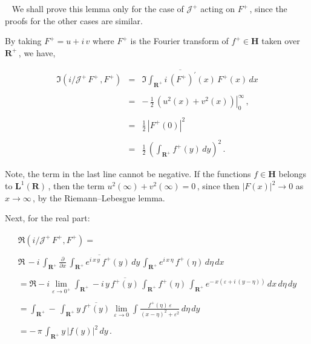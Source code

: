 \documentclass[11pt]{article}
\newenvironment{Proof}
{\bigskip\noindent{\bf Proof.}~\rm}{\bigskip}
\begin{document}
\begin{Proof}  We shall prove this lemma only for the case of
  ${\mathcal J}^+$ acting on $F^+$\,, since the proofs for the other
  cases are similar.

\vspace{.1in} \noindent By taking $F^+ = u + i\,v$ where $F^+$ is the Fourier
  transform of $f^+ \in {\mathbf H}$ taken over ${\mathbf R}^+$\,, we
  have, 

\begin{equation}%
 \begin{array}{rcl}
 \Im \left(i/{\mathcal J}^+\, F^+\,,F^+\right) & = &   
\displaystyle \Im \int_{{\mathbf R}^+} \overline{i\,(F^+)^\prime}(x) \,
F^+(x) \, dx \\ 
&& \\
& = &  \displaystyle  - \, \frac{1}{2} \, \left.(u^2(x) +
v^2(x))\right|_0^\infty\,, \\
&& \\
& = &  \displaystyle  \frac{1}{2} \, |F^+(0)|^2 \\
&& \\
& = &  \displaystyle \frac{1}{2} \, \left(\int_{{\mathbf R}^+} f^+(y) \,
    dy\right)^2\,. 
  \end{array}
  \label{equation:2.7}
\end{equation}

\noindent Note, the term in the last line cannot be negative.  If the
functions $f \in {\mathbf H}$ belongs to ${\mathbf L}^1({\mathbf
  R})$\,, then the term $u^2(\infty) + v^2(\infty) = 0$\,, since then
$|F(x)|^2 \to 0$ as $x \to \infty$\,, by the Riemann--Lebesgue lemma.

\vspace{.2in} \noindent Next, for the real part:

\begin{equation}%
  \begin{array}{l} 
    \Re (i/{\mathcal J}^+\,F^+,F^+) = \\
    \\
    \displaystyle \Re \, -i \, \int_{{\mathbf R}^+}
    \overline{\frac{{\partial}}{{\partial} x} \, 
      \int_{{\mathbf R}^+} e^{i\,x\,y} \, f^+(y) \, dy} \,
    \int_{{\mathbf R}^+} e^{i\,x\,\eta} \, f^+(\eta) \, d\eta \, dx \\
  \\
  =  \displaystyle \Re -i \lim_{{\varepsilon} \to 0^+} \int_{{\mathbf
      R}^+} -i\,y\,\overline{f^+(y)} \, 
  \int_{{\mathbf R}^+} f^+(\eta) \, \int_{{\mathbf R}^+} 
  e^{-\,x({\varepsilon} + i\,(y-\eta))} \, dx \, d\eta \, dy \\
\\
=  \displaystyle \int_{{\mathbf R}^+} - \,  \int_{{\mathbf
      R}^+}  y\,\overline{f^+(y)} \, \lim_{{\varepsilon} \to 0} \int
  \frac{f^+(\eta)\,\varepsilon}{(x - \eta)^2 + {\varepsilon}^2} \, d\eta \, dy \\
\\
  = \displaystyle - \, \pi \, \int_{{\mathbf R}^+} y\,|f(y)|^2\,dy\,.
  \end{array}
  \label{equation:2.8}
\end{equation}


\end{Proof}
\end{document}
